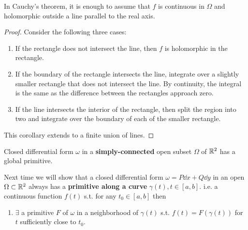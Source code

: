 \documentclass[a4paper,12pt]{article}
\begin{document}
\begin{corollary}
    In Cauchy's theorem, it is enough to assume that $f$ is continuous in $\Omega$ and holomorphic outside a line parallel to the real axis. \begin{proof}
        Consider the following three cases: \begin{enumerate}
            \item If the rectangle does not intersect the line, then $f$ is holomorphic in the rectangle.
            \item If the boundary of the rectangle intersects the line, integrate over a slightly smaller rectangle that does not intersect the line. By continuity, the integral is the same as the difference between the rectangles approach zero.
            \item If the line intersects the interior of the rectangle, then split the region into two and integrate over the boundary of each of the smaller rectangle.
        \end{enumerate}
        This corollary extends to a finite union of lines.
    \end{proof}
\end{corollary}
\begin{theorem}
    Closed differential form $\omega$ in a \textbf{simply-connected} open subset $\Omega$ of $\mathbb{R}^2$ has a global primitive.
\end{theorem}
Next time we will show that a closed differential form $\omega=P\dd x+Q\dd y$ in an open $\Omega\subset\mathbb{R}^2$ always has a \textbf{primitive along a curve} $\gamma(t),t\in[a,b].$ i.e. a continuous function $f(t)$ s.t. for any $t_0\in[a,b]$ then \begin{enumerate}
    \item $\exists$ a primitive $F$ of $\omega$ in a neighborhood of $\gamma(t)$ s.t. $f(t)=F(\gamma(t))$ for $t$ sufficiently close to $t_0.$
\end{enumerate}
\end{document}
